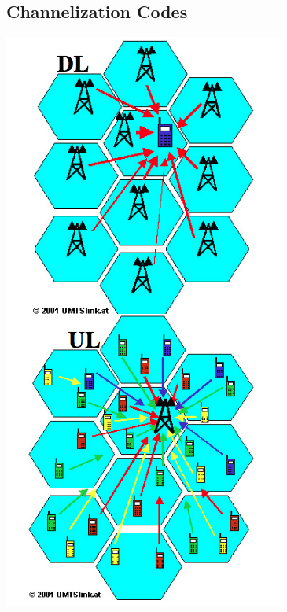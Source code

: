 \subsection{Channelization Codes}
\begin{minipage}{0.3\linewidth}
\includegraphics[width = \linewidth]{./Pics/UMTSChannel}\\

\end{minipage}
